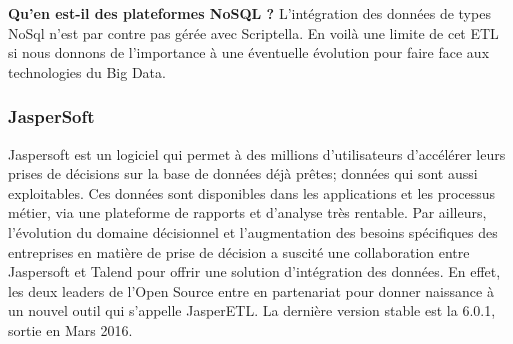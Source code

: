 \documentclass[12pt,a4wide,twoside]{report}
\begin{document}
\textbf{Qu'en est-il des plateformes NoSQL ?} \newline
L'intégration des données de types NoSql n'est par contre pas gérée avec Scriptella. \newline En voilà une limite de cet ETL si nous donnons de l'importance à une éventuelle évolution pour faire face aux technologies du Big Data.

\subsubsection{JasperSoft}
Jaspersoft est un logiciel qui permet à des millions d’utilisateurs d’accélérer leurs prises de décisions sur la base de données déjà prêtes; données qui sont aussi exploitables. Ces données sont disponibles dans les applications et les processus métier, via une plateforme de rapports et d’analyse très rentable.\newline
Par ailleurs, l’évolution du domaine décisionnel et l’augmentation des besoins spécifiques des entreprises en matière de prise de décision a suscité une collaboration entre Jaspersoft et Talend pour offrir une solution d’intégration des données. En effet, les deux leaders de l’Open Source entre en partenariat pour donner naissance à un nouvel outil qui s’appelle JasperETL.\newline
La dernière version stable est la 6.0.1, sortie en Mars 2016.
\end{document}
